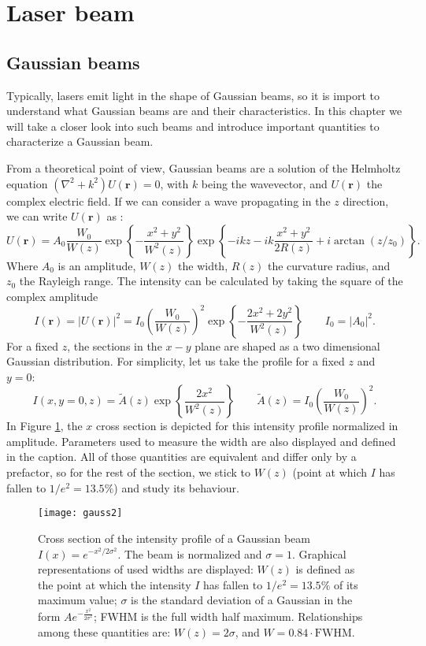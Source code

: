 \section{Laser beam}
\subsection{Gaussian beams}
\label{sec_diffraction}
Typically, lasers emit light in the shape of Gaussian beams, so it is import to understand what Gaussian beams are and their characteristics. In this chapter we will take a closer look into such beams and introduce important quantities to characterize a Gaussian beam. \par
From a theoretical point of view, Gaussian beams are a solution of the Helmholtz equation $(\nabla^2 + k^2)U(\mathbf{r}) = 0$, with $k$ being the wavevector, and $U(\mathbf{r})$ the complex electric field. If we can consider a wave propagating in the $z$ direction, we can write $U(\mathbf{r})$ as \cite{saleh}:
\begin{equation}
\label{gaussianbeams}
U(\mathbf{r}) = A_0 \frac{W_0}{W(z)}\exp\left\{-\frac{x^2+y^2}{W^2(z)}\right\}\exp\left\{-ikz-ik\frac{x^2+y^2}{2R(z)}+i\arctan(z/z_0)\right\}.
\end{equation}
Where $A_0$ is an amplitude, $W(z)$ the width, $R(z)$ the curvature radius, and $z_0$ the Rayleigh range. The intensity can be calculated by taking the square of the complex amplitude
\begin{equation}
\label{beamintensity}
I(\mathbf{r}) = |U(\mathbf{r})|^2 = I_0 \left(\frac{W_0}{W(z)}\right)^2 \exp\left\{-\frac{2x^2 + 2y^2}{W^2(z)}\right\}  \qquad I_0 = |A_0|^2.
\end{equation}
For a fixed $z$, the sections in the $x-y$ plane are shaped as a two dimensional Gaussian distribution. For simplicity, let us take the profile for a fixed $z$ and $y=0$:
\begin{equation}
I(x,y=0,z) = \widetilde{A}(z) \exp\left\{\frac{2x^2}{W^2(z)}\right\} \qquad \widetilde{A}(z) = I_0 \left(\frac{W_0}{W(z)}\right)^2  .
\end{equation}
In Figure \ref{gauss}, the $x$ cross section is depicted for this intensity profile normalized in amplitude. Parameters used to measure the width are also displayed and defined in the caption. All of those quantities are equivalent and differ only by a prefactor, so for the rest of the section, we stick to $W(z)$ (point at which $I$ has fallen to $1/e^2 = 13.5\%$) and study its behaviour.
\begin{figure}
\centering
\texttt{[image: gauss2]}
\caption{Cross section of the intensity profile of a Gaussian beam $I(x) = e^{-x^2/2\sigma^2}$. The beam is normalized and $\sigma=1$. Graphical representations of used widths are displayed: $W(z)$ is defined as the point at which the intensity $I$ has fallen to $1/e^2 = 13.5\%$ of its maximum value; $\sigma$ is the standard deviation of a Gaussian in the form $Ae^{-\frac{x^2}{2\sigma^2}}$; FWHM is the full width half maximum. Relationships among these quantities are: $W(z) = 2\sigma$, and $W = 0.84\cdot \text{FWHM}$.}
\label{gauss}
\end{figure}
